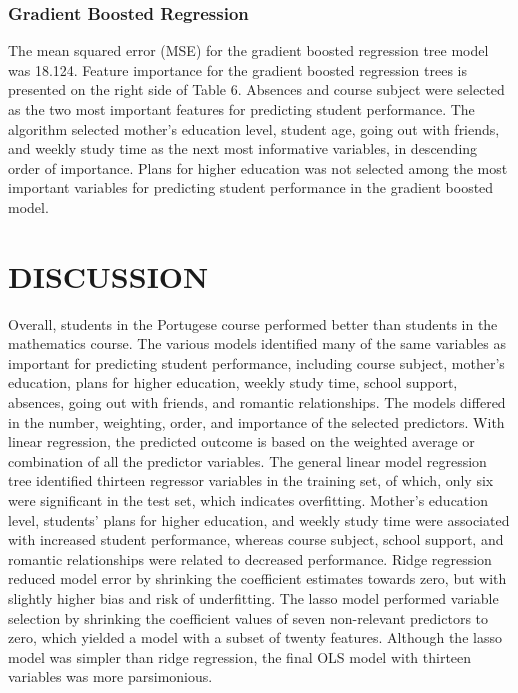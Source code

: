 \documentclass[sigconf]{acmart}
\begin{document}

\subsubsection{Gradient Boosted Regression}

The mean squared error (MSE) for the gradient boosted regression tree model  
was 18.124. Feature importance for the gradient boosted regression trees is 
presented on the right side of Table 6. Absences and course subject were 
selected as the two most important features for predicting student performance. 
The algorithm selected mother's education level, student age, going out with 
friends, and weekly study time as the next most informative variables, in 
descending order of importance. Plans for higher education was not selected 
among the most important variables for predicting student performance in 
the gradient boosted model.   


\section{DISCUSSION}

Overall, students in the Portugese course performed better than students in 
the mathematics course. The various models identified many of the same variables 
as important for predicting student performance, including course subject, 
mother's education, plans for higher education, weekly study time, school 
support, absences, going out with friends, and romantic relationships. The 
models differed in the number, weighting, order, and importance of the 
selected predictors. With linear regression, the predicted outcome is based
on the weighted average or combination of all the predictor variables. The 
general linear model regression tree identified thirteen regressor variables 
in the training set, of which, only six were significant in the test set, 
which indicates overfitting. Mother's education level, students' plans for 
higher education, and weekly study time were associated with increased student 
performance, whereas course subject, school support, and romantic relationships 
were related to decreased performance. Ridge regression reduced model error by 
shrinking the coefficient estimates towards zero, but with slightly higher bias 
and risk of underfitting. The lasso model performed variable selection by 
shrinking the coefficient values of seven non-relevant predictors to zero, which 
yielded a model with a subset of twenty features. Although the lasso model was 
simpler than ridge regression, the final OLS model with thirteen variables was 
more parsimonious. 
\end{document}
